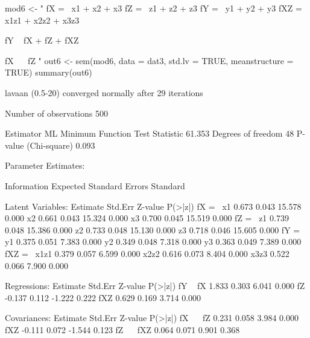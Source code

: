 \begin{Schunk}
\begin{Sinput}
 mod6 <- "
 fX =~ x1 + x2 + x3
 fZ =~ z1 + z2 + z3
 fY =~ y1 + y2 + y3
 fXZ =~ x1z1 + x2z2 + x3z3
 
 fY ~ fX + fZ + fXZ
 
 fX ~~ fZ
 "
 out6 <- 
     sem(mod6, data = dat3, std.lv = TRUE, meanstructure = TRUE)
 summary(out6)
\end{Sinput}
\begin{Soutput}
lavaan (0.5-20) converged normally after  29 iterations

  Number of observations                           500

  Estimator                                         ML
  Minimum Function Test Statistic               61.353
  Degrees of freedom                                48
  P-value (Chi-square)                           0.093

Parameter Estimates:

  Information                                 Expected
  Standard Errors                             Standard

Latent Variables:
                   Estimate  Std.Err  Z-value  P(>|z|)
  fX =~                                               
    x1                0.673    0.043   15.578    0.000
    x2                0.661    0.043   15.324    0.000
    x3                0.700    0.045   15.519    0.000
  fZ =~                                               
    z1                0.739    0.048   15.386    0.000
    z2                0.733    0.048   15.130    0.000
    z3                0.718    0.046   15.605    0.000
  fY =~                                               
    y1                0.375    0.051    7.383    0.000
    y2                0.349    0.048    7.318    0.000
    y3                0.363    0.049    7.389    0.000
  fXZ =~                                              
    x1z1              0.379    0.057    6.599    0.000
    x2z2              0.616    0.073    8.404    0.000
    x3z3              0.522    0.066    7.900    0.000

Regressions:
                   Estimate  Std.Err  Z-value  P(>|z|)
  fY ~                                                
    fX                1.833    0.303    6.041    0.000
    fZ               -0.137    0.112   -1.222    0.222
    fXZ               0.629    0.169    3.714    0.000

Covariances:
                   Estimate  Std.Err  Z-value  P(>|z|)
  fX ~~                                               
    fZ                0.231    0.058    3.984    0.000
    fXZ              -0.111    0.072   -1.544    0.123
  fZ ~~                                               
    fXZ               0.064    0.071    0.901    0.368


\end{Soutput}
\end{Schunk}
